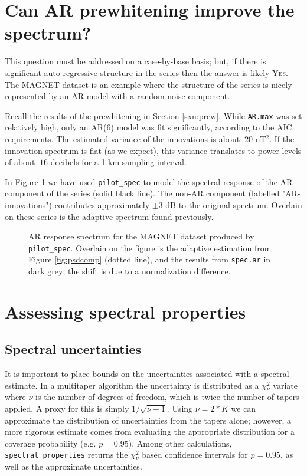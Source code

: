 \documentclass[10pt]{article}\usepackage[]{graphicx}\usepackage[]{color}
\newcommand{\SC}[1]{\textsc{#1}}
\newcommand{\Rcmd}[1]{\texttt{#1}}
\begin{document}
\section{Can AR prewhitening improve the spectrum?}

This question must be addressed on a case-by-base basis; but, if there
is significant auto-regressive structure in the series then
the answer is likely \SC{Yes}.  
The MAGNET dataset is an example where the structure of the series
is nicely represented by an AR model with a random noise component.

Recall the results of the prewhitening in Section \ref{sxn:prew}.
While \Rcmd{AR.max} was set relatively high,
only an AR(6) model was fit significantly, according to the AIC requirements. 
The estimated variance of the innovations is about $~20$ nT$^2$.
If the innovation spectrum is flat (as we expect), this variance translates to power levels
of about $~16$ decibels for a 1 km sampling interval.  



In Figure \ref{fig:arspecvar} we have used \Rcmd{pilot\_spec} to 
model the spectral response of the AR component of the series (solid
black line). The non-AR component (labelled "AR-innovations")
contributes approximately $\pm 3$ dB to the original spectrum.
Overlain on these series is the adaptive spectrum found previously.

\begin{figure}[!htbp]
\begin{center}

\caption{AR response spectrum for the MAGNET dataset produced by 
\Rcmd{pilot\_spec}. Overlain on the figure is the adaptive estimation 
from Figure \ref{fig:psdcomp} (dotted line),
and the results from \Rcmd{spec.ar} in dark grey; the shift is due to a
normalization difference.}
\label{fig:arspecvar}
\end{center}
\end{figure}

\clearpage

\section{Assessing spectral properties}
\subsection{Spectral uncertainties}
It is important to place bounds on the uncertainties associated
with a spectral estimate. In a multitaper algorithm the uncertainty is distributed as
a $\chi{}_{\nu}^2$ variate where $\nu$ is the number of degrees of freedom, which is twice the
number of tapers applied. A proxy for this is simply $1/\sqrt{\nu - 1}$.
Using $\nu = 2*K$ we can approximate the distribution
of uncertainties from the tapers alone; however, a more
rigorous estimate comes from evaluating the appropriate 
distribution  for a coverage probability (e.g. $p=0.95$).
Among other calculations, \Rcmd{spectral\_properties} returns the 
$\chi{}_{\nu}^2$ based confidence intervals for $p=0.95$, as well as the
approximate uncertainties.  
\end{document}
